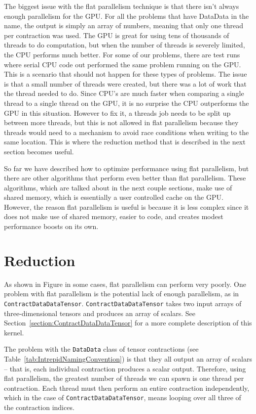 The biggest issue with the flat parallelism technique is that there isn't always enough parallelism for the GPU. For all the problems that have DataData in the name, the output is simply an array of numbers, meaning that only one thread per contraction was used. The GPU is great for using tens of thousands of threads to do computation, but when the number of threads is severely limited, the CPU performs much better. For some of our problems, there are test runs where serial CPU code out performed the same problem running on the GPU. This is a scenario that should not happen for these types of problems. The issue is that a small number of threads were created, but there was a lot of work that the thread needed to do. Since CPU's are much faster when comparing a single thread to a single thread on the GPU, it is no surprise the CPU outperforms the GPU in this situation. However to fix it, a threads job needs to be split up between more threads, but this is not allowed in flat parallelism because they threads would need to a mechanism to avoid race conditions when writing to the same location. This is where the reduction method that is described in the next section becomes useful.

So far we have described how to optimize performance using flat parallelism, but there are other algorithms that perform even better than flat parallelism. These algorithms, which are talked about in the next couple sections, make use of shared memory, which is essentially a user controlled cache on the GPU. However, the reason flat parallelism is useful is because it is less complex since it does not make use of shared memory, easier to code, and creates modest performance boosts on its own. 

\section{Reduction} \label{reduction}
As shown in Figure %
in some cases, flat parallelism can perform very poorly.  One problem with flat
parallelism is the potential lack of enough parallelism, as in
\texttt{ContractDataDataTensor}.  \texttt{ContractDataDataTensor} takes two
input arrays of three-dimensional tensors and produces an array of scalars.  See
Section~\ref{section:ContractDataDataTensor} for a more complete description of
this kernel.

The problem with the \texttt{DataData} class of tensor contractions (see
Table~\ref{tab:IntrepidNamingConvention}) is that they all output an array of
scalars -- that is, each individual contraction produces a scalar output.
Therefore, using flat parallelism, the greatest number of threads we can spawn
is one thread per contraction.  Each thread must then perform an entire
contraction independently, which in the case of \texttt{ContractDataDataTensor},
means looping over all three of the contraction indices.


